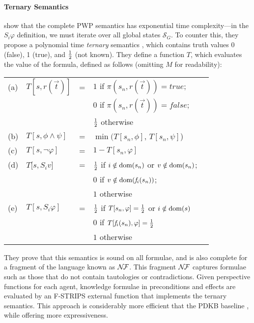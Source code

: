 \paragraph{Ternary Semantics}
\citet{Hu2022-ul} show that the complete PWP semantics has exponential time complexity---in the $S_i \varphi$ definition, we must iterate over all global states $\mathcal{S}_G$. To counter this, they propose a polynomial time \emph{ternary} semantics \cite{levesque1998completeness}, which contains truth values 0 (false), 1 (true), and $\frac{1}{2}$ (not known). They define a function $T$, which evaluates the value of the formula, defined as follows (omitting $M$ for readability):

\vspace{2mm}
\noindent
\begin{tabular}{@{}lllll}
 (a) & $T[s, r(\vec{t})]$ & =
         &  $1$ if $\pi(s_n, r(\vec{t})) = true$; \\
     & & &  $0$ if $\pi(s_n, r(\vec{t})) = false$; \\
     & & &  $\frac{1}{2}$  otherwise\\[2mm]

 (b) & $ T[s, \phi \land \psi]$ & = & $\min(T[s_n,\phi]$, $ T[s_n,\psi]$)\\[2mm]
 (c) & $T[s,\neg \varphi]$ & = &  $1-T[s_n, \varphi]$\\[2mm]

 (d) & $T[s, S_i v$] & = 
        & $\frac{1}{2}$  if $ i \notin \textrm{dom}(s_n)$ or $v \notin \textrm{dom}(s_n)$;\\
     &&   & $0$ if  $v \notin \textrm{dom}(\mathit{f}_i(s_n))$;\\
     &&   & $1$ otherwise\\[2mm]
 (e) & $T[s,S_i \varphi]$ & = 
        & $\frac{1}{2}$ if $T[s_n,\varphi]=\frac{1}{2}$ or $i \notin \textrm{dom}(s)$\\
      &&  & $ 0 $  if $ T[\mathit{f}_i(s_n),\varphi]=\frac{1}{2}$\\
      &&  & $ 1 $  otherwise
\end{tabular}
\vspace{2mm}

They prove that this semantics is sound on all formulae, and is also complete for a fragment of the language known as $\mathcal{N}\hspace{-0.5mm}\mathcal{F}$. 
This fragment $\mathcal{N}\hspace{-0.5mm}\mathcal{F}$  captures formulae such as those that do not contain tautologies or contradictions. Given perspective functions for each agent, knowledge formulae in preconditions and effects are evaluated by an F-STRIPS external function that implements the ternary semantics. 
This approach is considerably more efficient that the PDKB baseline \citet{DBLP:journals/ai/MuiseBFMMPS22}, while offering more expressiveness.


